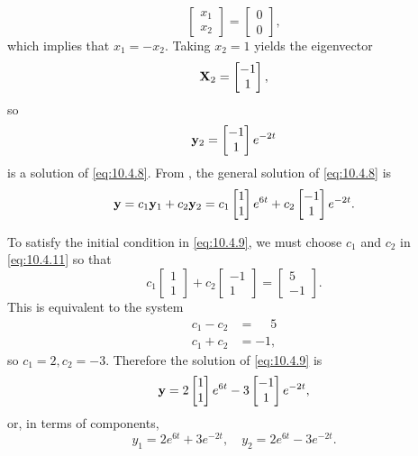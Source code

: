 \begin{alistSolution}
\[\begin{bmatrix} x_1\\x_2\end{bmatrix}=
\begin{bmatrix} 0\\0\end{bmatrix},
\]
which implies that $x_1=-x_2$.  Taking $x_2=1$ yields the eigenvector
\[
\mathbf{X}_2=\begin{bmatrix}-1\\1\end{bmatrix},
\]
so
\[
\mathbf{y}_2=\begin{bmatrix}-1\\1\end{bmatrix}e^{-2t}
\]
is a solution of  \eqref{eq:10.4.8}.
From , the general solution of
\eqref{eq:10.4.8} is
\begin{equation}\label{eq:10.4.11}
\mathbf{y}=c_1\mathbf{y}_1+c_2\mathbf{y}_2=c_1\begin{bmatrix}1\\1\end{bmatrix}e^{6t}
+c_2\begin{bmatrix}-1\\1\end{bmatrix}e^{-2t}.
\end{equation}

\item
 To satisfy the initial condition in  \eqref{eq:10.4.9}, we must choose
$c_1$ and $c_2$ in  \eqref{eq:10.4.11} so that
\[
c_1\begin{bmatrix}1\\1\end{bmatrix}+c_2\begin{bmatrix}-1\\1\end{bmatrix}
=\begin{bmatrix}5\\-1\end{bmatrix}.
\]
This is equivalent to the system
\begin{align*}
c_1-c_2&=\phantom{-}5\\
c_1+c_2&=-1,
\end{align*}
so $c_1=2, c_2=-3$.  Therefore the solution of
\eqref{eq:10.4.9} is
\[
\mathbf{y}=2\begin{bmatrix}1\\1\end{bmatrix}e^{6t}-3
\begin{bmatrix}-1\\1\end{bmatrix}e^{-2t},
\]
or, in terms of components,
\[
y_1=2e^{6t}+3e^{-2t},\quad y_2=2e^{6t}-3e^{-2t}.
\]
\end{alistSolution}

